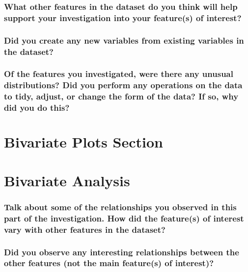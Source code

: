 \documentclass[]{article}
\begin{document}
\subsubsection{What other features in the dataset do you think will help
support your investigation into your feature(s) of
interest?}\label{what-other-features-in-the-dataset-do-you-think-will-help-support-your-investigation-into-your-features-of-interest}

\subsubsection{Did you create any new variables from existing variables
in the
dataset?}\label{did-you-create-any-new-variables-from-existing-variables-in-the-dataset}

\subsubsection{Of the features you investigated, were there any unusual
distributions? Did you perform any operations on the data to tidy,
adjust, or change the form of the data? If so, why did you do
this?}\label{of-the-features-you-investigated-were-there-any-unusual-distributions-did-you-perform-any-operations-on-the-data-to-tidy-adjust-or-change-the-form-of-the-data-if-so-why-did-you-do-this}

\section{Bivariate Plots Section}\label{bivariate-plots-section}

\section{Bivariate Analysis}\label{bivariate-analysis}

\subsubsection{Talk about some of the relationships you observed in this
part of the investigation. How did the feature(s) of interest vary with
other features in the
dataset?}\label{talk-about-some-of-the-relationships-you-observed-in-this-part-of-the-investigation.-how-did-the-features-of-interest-vary-with-other-features-in-the-dataset}

\subsubsection{Did you observe any interesting relationships between the
other features (not the main feature(s) of
interest)?}\label{did-you-observe-any-interesting-relationships-between-the-other-features-not-the-main-features-of-interest}
\end{document}

